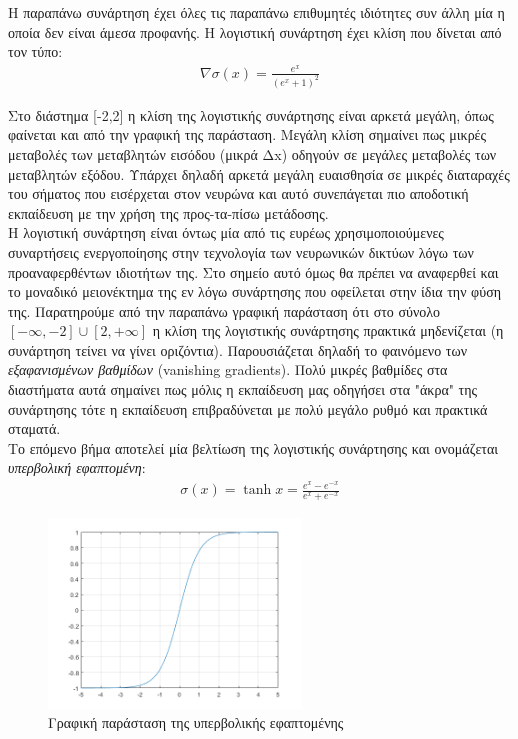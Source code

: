 \documentclass[11pt]{article} %
\begin{document}
Η παραπάνω συνάρτηση έχει όλες τις παραπάνω επιθυμητές ιδιότητες συν άλλη μία η οποία δεν είναι άμεσα προφανής. H λογιστική συνάρτηση έχει κλίση που δίνεται από τον τύπο:
\begin{align*}
\nabla \sigma(x) = \frac{e^x}{(e^x + 1)^2}
\end{align*}

 Στο διάστημα [-2,2] η κλίση της λογιστικής συνάρτησης είναι αρκετά μεγάλη, όπως φαίνεται και από την γραφική της παράσταση. Μεγάλη κλίση σημαίνει πως μικρές μεταβολές των μεταβλητών εισόδου (μικρά Δx) οδηγούν σε μεγάλες μεταβολές των μεταβλητών εξόδου. Υπάρχει δηλαδή αρκετά μεγάλη ευαισθησία σε μικρές διαταραχές του σήματος που εισέρχεται στον νευρώνα και αυτό συνεπάγεται πιο αποδοτική εκπαίδευση με την χρήση της προς-τα-πίσω μετάδοσης. \\

Η λογιστική συνάρτηση είναι όντως μία από τις ευρέως χρησιμοποιούμενες συναρτήσεις ενεργοποίησης στην τεχνολογία των νευρωνικών δικτύων λόγω των προαναφερθέντων ιδιοτήτων της. Στο σημείο αυτό όμως θα πρέπει να αναφερθεί και το μοναδικό μειονέκτημα της εν λόγω συνάρτησης που οφείλεται στην ίδια την φύση της. Παρατηρούμε από την παραπάνω γραφική παράσταση ότι στο σύνολο $[-\infty,-2] \cup [2, +\infty]$ η κλίση της λογιστικής συνάρτησης πρακτικά μηδενίζεται (η συνάρτηση τείνει να γίνει οριζόντια). Παρουσιάζεται δηλαδή το φαινόμενο των \textit{εξαφανισμένων βαθμίδων} (vanishing gradients). Πολύ μικρές βαθμίδες στα διαστήματα αυτά σημαίνει πως μόλις η εκπαίδευση μας οδηγήσει στα "άκρα" της συνάρτησης τότε η εκπαίδευση επιβραδύνεται με πολύ μεγάλο ρυθμό και πρακτικά σταματά.\\

Το επόμενο βήμα αποτελεί μία βελτίωση της λογιστικής συνάρτησης και ονομάζεται \textit{υπερβολική εφαπτομένη}:
\begin{align*}
\sigma(x) = \tanh{x} = \frac{e^x - e^{-x}}{e^x + e^{-x}}
\end{align*}

\begin{figure}[h]
    \centering
    \includegraphics[width=0.6\textwidth]{tanh}
    \caption{Γραφική παράσταση της υπερβολικής εφαπτομένης}
    \label{fig:tanh curve}
\end{figure}
\end{document}
